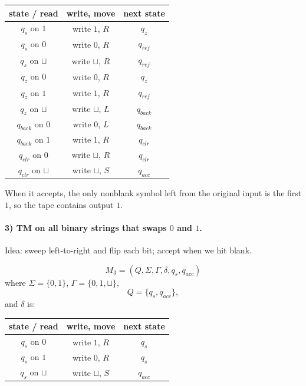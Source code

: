 \documentclass{article}
\newcommand{\blank}{\sqcup}
\theoremstyle{theorem}
\theoremstyle{definition}
\theoremstyle{remark}
\begin{document}
\begin{center}
\begin{tabular}{|c|c|c|}
  \hline
  state / read & write, move & next state \\
  \hline
  $q_s$ on $1$ & write $1$, $R$ & $q_z$ \\
  $q_s$ on $0$ & write $0$, $R$ & $q_{rej}$ \\
  $q_s$ on $\blank$ & write $\blank$, $R$ & $q_{rej}$ \\
  \hline
  $q_z$ on $0$ & write $0$, $R$ & $q_z$ \\
  $q_z$ on $1$ & write $1$, $R$ & $q_{rej}$ \\
  $q_z$ on $\blank$ & write $\blank$, $L$ & $q_{back}$ \\
  \hline
  $q_{back}$ on $0$ & write $0$, $L$ & $q_{back}$ \\
  $q_{back}$ on $1$ & write $1$, $R$ & $q_{clr}$ \\
  \hline
  $q_{clr}$ on $0$ & write $\blank$, $R$ & $q_{clr}$ \\
  $q_{clr}$ on $\blank$ & write $\blank$, $S$ & $q_{acc}$ \\
  \hline
\end{tabular}
\end{center}

When it accepts, the only nonblank symbol left from the original input is the first $1$, so the tape contains output $1$.

\paragraph{3) TM on all binary strings that swaps $0$ and $1$.}
Idea: sweep left-to-right and flip each bit; accept when we hit blank.

\[
M_3 = (Q,\Sigma,\Gamma,\delta,q_s,q_{acc})
\]
where $\Sigma=\{0,1\}$, $\Gamma=\{0,1,\blank\}$,
\[
Q=\{q_s,q_{acc}\},
\]
and $\delta$ is:

\begin{center}
\begin{tabular}{|c|c|c|}
  \hline
  state / read & write, move & next state \\
  \hline
  $q_s$ on $0$ & write $1$, $R$ & $q_s$ \\
  $q_s$ on $1$ & write $0$, $R$ & $q_s$ \\
  $q_s$ on $\blank$ & write $\blank$, $S$ & $q_{acc}$ \\
  \hline
\end{tabular}
\end{center}
\end{document}
